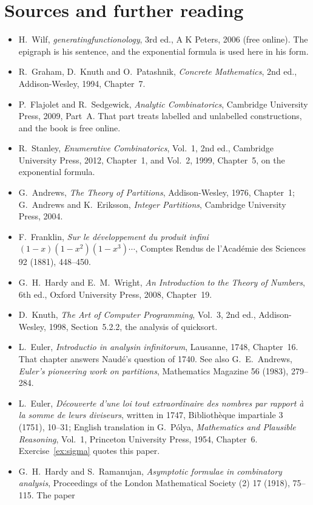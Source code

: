 \section*{Sources and further reading}

\begin{itemize}
\item H.~Wilf, \emph{generatingfunctionology}, 3rd ed., A K Peters, 2006 (free online). The epigraph is his sentence, and the exponential formula is used here in his form.
\item R.~Graham, D.~Knuth and O.~Patashnik, \emph{Concrete Mathematics}, 2nd ed., Addison-Wesley, 1994, Chapter~7.
\item P.~Flajolet and R.~Sedgewick, \emph{Analytic Combinatorics}, Cambridge University Press, 2009, Part~A. That part treats labelled and
unlabelled constructions, and the book is free online.
\item R.~Stanley, \emph{Enumerative Combinatorics}, Vol.~1, 2nd ed., Cambridge University Press, 2012, Chapter~1, and
Vol.~2, 1999, Chapter~5, on the exponential formula.
\item G.~Andrews, \emph{The Theory of Partitions}, Addison-Wesley, 1976, Chapter~1; G.~Andrews and K.~Eriksson,
\emph{Integer Partitions}, Cambridge University Press, 2004.
\item F.~Franklin, \emph{Sur le d\'eveloppement du produit infini $(1-x)(1-x^2)(1-x^3)\cdots$}, Comptes Rendus de
l'Acad\'emie des Sciences 92 (1881), 448--450.
\item G.~H.~Hardy and E.~M.~Wright, \emph{An Introduction to the Theory of Numbers}, 6th ed., Oxford University Press,
2008, Chapter~19.
\item D.~Knuth, \emph{The Art of Computer Programming}, Vol.~3, 2nd ed., Addison-Wesley, 1998, Section~5.2.2, the analysis of
quicksort.
\item L.~Euler, \emph{Introductio in analysin infinitorum}, Lausanne, 1748, Chapter~16. That chapter answers Naud\'e's question of 1740. See also G.~E.~Andrews, \emph{Euler's pioneering work on partitions}, Mathematics Magazine 56 (1983), 279--284.
\item L.~Euler, \emph{D\'ecouverte d'une loi tout extraordinaire des nombres par rapport \`a la somme de leurs diviseurs}, written in 1747, Biblioth\`eque impartiale 3
(1751), 10--31; English translation in G.~P\'olya, \emph{Mathematics and Plausible Reasoning}, Vol.~1, Princeton University Press, 1954, Chapter~6. Exercise~\ref{ex:sigma} quotes this paper.
\item G.~H.~Hardy and S.~Ramanujan, \emph{Asymptotic formulae in combinatory analysis}, Proceedings of the London Mathematical Society (2) 17 (1918), 75--115. The paper

\end{itemize}
